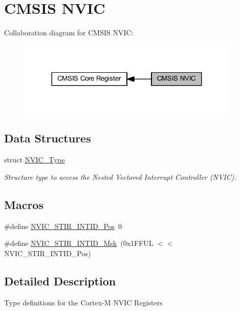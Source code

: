 \hypertarget{group___c_m_s_i_s___n_v_i_c}{}\section{C\+M\+S\+IS N\+V\+IC}
\label{group___c_m_s_i_s___n_v_i_c}
Collaboration diagram for C\+M\+S\+IS N\+V\+IC\+:
\nopagebreak
\begin{figure}[H]
\begin{center}
\leavevmode
\includegraphics[width=299pt]{group___c_m_s_i_s___n_v_i_c}
\end{center}
\end{figure}
\subsection*{Data Structures}
\begin{DoxyCompactItemize}
\item 
struct \hyperlink{struct_n_v_i_c___type}{N\+V\+I\+C\+\_\+\+Type}
\begin{DoxyCompactList}\small\item\em Structure type to access the Nested Vectored Interrupt Controller (N\+V\+IC). \end{DoxyCompactList}\end{DoxyCompactItemize}
\subsection*{Macros}
\begin{DoxyCompactItemize}
\item 
\#define \hyperlink{group___c_m_s_i_s___n_v_i_c_ga9eebe495e2e48d302211108837a2b3e8}{N\+V\+I\+C\+\_\+\+S\+T\+I\+R\+\_\+\+I\+N\+T\+I\+D\+\_\+\+Pos}~0
\item 
\#define \hyperlink{group___c_m_s_i_s___n_v_i_c_gae4060c4dfcebb08871ca4244176ce752}{N\+V\+I\+C\+\_\+\+S\+T\+I\+R\+\_\+\+I\+N\+T\+I\+D\+\_\+\+Msk}~(0x1\+F\+F\+U\+L $<$$<$ N\+V\+I\+C\+\_\+\+S\+T\+I\+R\+\_\+\+I\+N\+T\+I\+D\+\_\+\+Pos)
\end{DoxyCompactItemize}


\subsection{Detailed Description}
Type definitions for the Cortex-\/M N\+V\+IC Registers 

